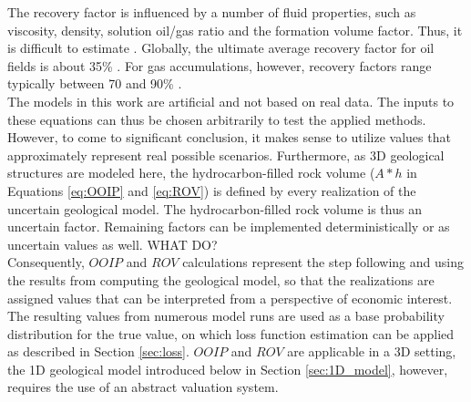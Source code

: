         The recovery factor is influenced by a number of fluid properties, such as viscosity, density, solution oil/gas ratio and the formation volume factor. Thus, it is difficult to estimate \citep{dean2007volumetric}. Globally, the ultimate average recovery factor for oil fields is about 35\% \citep{labastie2011increasingRF}. For gas accumulations, however, recovery factors range typically between 70 and 90\% \citep{dean2007volumetric}.\\
        The models in this work are artificial and not based on real data. The inputs to these equations can thus be chosen arbitrarily to test the applied methods. However, to come to significant conclusion, it makes sense to utilize values that approximately represent real possible scenarios. Furthermore, as 3D geological structures are modeled here, the hydrocarbon-filled rock volume ($A * h$ in Equations \ref{eq:OOIP} and \ref{eq:ROV}) is defined by every realization of the uncertain geological model. The hydrocarbon-filled rock volume is thus an uncertain factor. Remaining factors can be implemented deterministically or as uncertain values as well. WHAT DO?\\%
        Consequently, $OOIP$ and $ROV$ calculations represent the step following and using the results from computing the geological model, so that the realizations are assigned values that can be interpreted from a perspective of economic interest. The resulting values from numerous model runs are used as a base probability distribution for the true value, on which loss function estimation can be applied as described in Section \ref{sec:loss}. $OOIP$ and $ROV$ are applicable in a 3D setting, the 1D geological model introduced below in Section \ref{sec:1D_model}, however, requires the use of an abstract valuation system.
		
